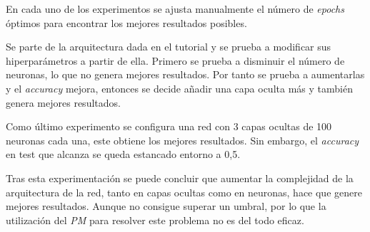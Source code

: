 \documentclass{uc3mpracticas}
\begin{document}
En cada uno de los experimentos se ajusta manualmente el número de \textit{epochs} óptimos para encontrar los mejores resultados posibles.

\vspace{2mm}

Se parte de la arquitectura dada en el tutorial y se prueba a modificar sus hiperparámetros a partir de ella. Primero se prueba a disminuir el número de neuronas, lo que no genera mejores resultados. Por tanto se prueba a aumentarlas y el \textit{accuracy} mejora, entonces se decide añadir una capa oculta más y también genera mejores resultados.

\vspace{1mm}

Como último experimento se configura una red con 3 capas ocultas de 100 neuronas cada una, este obtiene los mejores resultados. Sin embargo, el \textit{accuracy} en test que alcanza se queda estancado entorno a 0,5.

\vspace{2mm}

Tras esta experimentación se puede concluir que aumentar la complejidad de la arquitectura de la red, tanto en capas ocultas como en neuronas, hace que genere mejores resultados. Aunque no consigue superar un umbral, por lo que la utilización del \textit{PM} para resolver este problema no es del todo eficaz.
\end{document}
